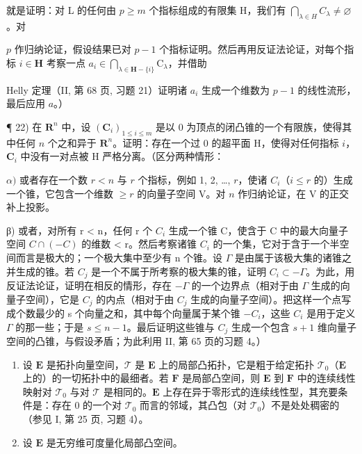 就是证明：对 L 的任何由 \(p \geqslant m\) 个指标组成的有限集 H，我们有 \(\bigcap_{\lambda \in H} C_{\lambda} \neq \varnothing\)。对

\(p\) 作归纳论证，假设结果已对 \(p - 1\) 个指标证明。然后再用反证法论证，对每个指标 \(i \in \mathbf{H}\) 考察一点 \(a_i \in \bigcap_{\lambda \in \mathbf{H} - \{i\}} \mathrm{C}_\lambda\)，并借助

Helly 定理（II, 第 68 页, 习题 21）证明诸 \(a_{i}\) 生成一个维数为 \(p - 1\) 的线性流形，最后应用 \(a\)。）

¶ 22) 在 \(\mathbf{R}^n\) 中，设 \((\mathbf{C}_i)_{1 \leqslant i \leqslant m}\) 是以 0 为顶点的闭凸锥的一个有限族，使得其中任何 \(n\) 个之和异于 \(\mathbf{R}^n\)。证明：存在一个过 0 的超平面 H，使得对任何指标 \(i\)，\(\mathbf{C}_i\) 中没有一对点被 H 严格分离。（区分两种情形：

\(\alpha)\) 或者存在一个数 \(r < n\) 与 \(r\) 个指标，例如 1, 2, \ldots, \(r\)，使诸 \(C_i\)（\(i \leqslant r\) 的）生成一个锥，它包含一个维数 \(\geqslant r\) 的向量子空间 V。对 \(n\) 作归纳论证，在 V 的正交补上投影。

β) 或者，对所有 r < n，任何 r 个 \(C_{i}\) 生成一个锥 C，使含于 C 中的最大向量子空间 \(C \cap (-C)\) 的维数 < r。然后考察诸锥 \(C_{i}\) 的一个集，它对于含于一个半空间而言是极大的；一个极大集中至少有 n 个锥。设 \(\Gamma\) 是由属于该极大集的诸锥之并生成的锥。若 \(C_{j}\) 是一个不属于所考察的极大集的锥，证明 \(C_{i} \subset -\Gamma\)。为此，用反证法论证，证明在相反的情形，存在 \(-\Gamma\) 的一个边界点（相对于由 \(\Gamma\) 生成的向量子空间），它是 \(C_{j}\) 的内点（相对于由 \(C_{j}\) 生成的向量子空间）。把这样一个点写成个数最少的 s 个向量之和，其中每个向量属于某个锥 \(-C_{i}\)，这些 \(C_{i}\) 是用于定义 \(\Gamma\) 的那一些；于是 \(s \leqslant n - 1\)。最后证明这些锥与 \(C_{j}\) 生成一个包含 \(s + 1\) 维向量子空间的凸锥，与假设矛盾；为此利用 II, 第 65 页的习题 4。）

\begin{enumerate}
\def\labelenumi{\arabic{enumi})}
\setcounter{enumi}{22}
\item
  设 \(\mathbf{E}\) 是拓扑向量空间，\(\mathcal{T}\) 是 \(\mathbf{E}\) 上的局部凸拓扑，它是粗于给定拓扑 \(\mathcal{T}_0\)（\(\mathbf{E}\) 上的）的一切拓扑中的最细者。若 \(\mathbf{F}\) 是局部凸空间，则 \(\mathbf{E}\) 到 \(\mathbf{F}\) 中的连续线性映射对 \(\mathcal{T}_0\) 与对 \(\mathcal{T}\) 是相同的。\(\mathbf{E}\) 上存在异于零形式的连续线性型，其充要条件是：存在 0 的一个对 \(\mathcal{T}_0\) 而言的邻域，其凸包（对 \(\mathcal{T}_0\)）不是处处稠密的（参见 I, 第 25 页, 习题 4）。
\item
  设 \(\mathbf{E}\) 是无穷维可度量化局部凸空间。
\end{enumerate}

